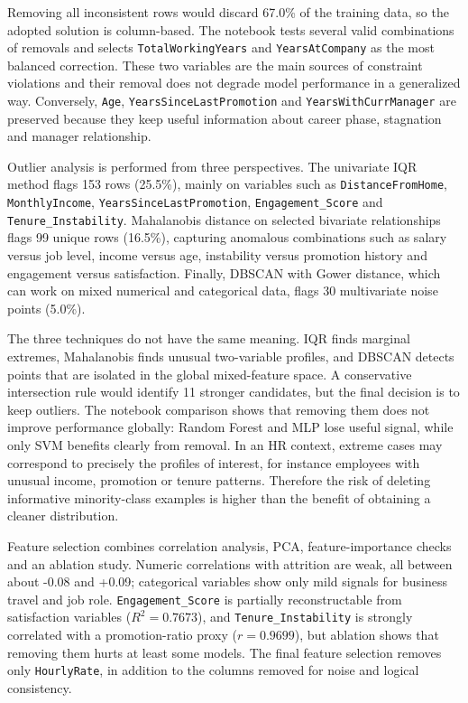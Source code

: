 \documentclass[lettersize,journal]{IEEEtran}
\begin{document}
Removing all inconsistent rows would discard 67.0\% of the training data, so the adopted solution is column-based. The notebook tests several valid combinations of removals and selects \texttt{TotalWorkingYears} and \texttt{YearsAtCompany} as the most balanced correction. These two variables are the main sources of constraint violations and their removal does not degrade model performance in a generalized way. Conversely, \texttt{Age}, \texttt{YearsSinceLastPromotion} and \texttt{YearsWithCurrManager} are preserved because they keep useful information about career phase, stagnation and manager relationship.

Outlier analysis is performed from three perspectives. The univariate IQR method flags 153 rows (25.5\%), mainly on variables such as \texttt{DistanceFromHome}, \texttt{MonthlyIncome}, \texttt{YearsSinceLastPromotion}, \texttt{Engagement\_Score} and \texttt{Tenure\_Instability}. Mahalanobis distance on selected bivariate relationships flags 99 unique rows (16.5\%), capturing anomalous combinations such as salary versus job level, income versus age, instability versus promotion history and engagement versus satisfaction. Finally, DBSCAN with Gower distance, which can work on mixed numerical and categorical data, flags 30 multivariate noise points (5.0\%).

The three techniques do not have the same meaning. IQR finds marginal extremes, Mahalanobis finds unusual two-variable profiles, and DBSCAN detects points that are isolated in the global mixed-feature space. A conservative intersection rule would identify 11 stronger candidates, but the final decision is to keep outliers. The notebook comparison shows that removing them does not improve performance globally: Random Forest and MLP lose useful signal, while only SVM benefits clearly from removal. In an HR context, extreme cases may correspond to precisely the profiles of interest, for instance employees with unusual income, promotion or tenure patterns. Therefore the risk of deleting informative minority-class examples is higher than the benefit of obtaining a cleaner distribution.

Feature selection combines correlation analysis, PCA, feature-importance checks and an ablation study. Numeric correlations with attrition are weak, all between about -0.08 and +0.09; categorical variables show only mild signals for business travel and job role. \texttt{Engagement\_Score} is partially reconstructable from satisfaction variables ($R^2 = 0.7673$), and \texttt{Tenure\_Instability} is strongly correlated with a promotion-ratio proxy ($r = 0.9699$), but ablation shows that removing them hurts at least some models. The final feature selection removes only \texttt{HourlyRate}, in addition to the columns removed for noise and logical consistency.
\end{document}
